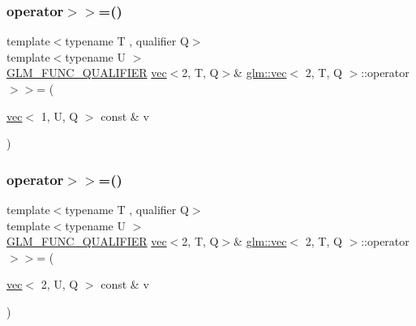 \mbox{\label{structglm_1_1vec_3_012_00_01_t_00_01_q_01_4_a9831eed973635e3d4cea367592355f63}} 
\subsubsection{\texorpdfstring{operator$>$$>$=()}{operator>>=()}\hspace{0.1cm}{\footnotesize\ttfamily [5/6]}}
{\footnotesize\ttfamily template$<$typename T , qualifier Q$>$ \\
template$<$typename U $>$ \\
\hyperlink{setup_8hpp_a33fdea6f91c5f834105f7415e2a64407}{G\+L\+M\+\_\+\+F\+U\+N\+C\+\_\+\+Q\+U\+A\+L\+I\+F\+I\+ER} \hyperlink{structglm_1_1vec}{vec}$<$2, T, Q$>$\& \hyperlink{structglm_1_1vec}{glm\+::vec}$<$ 2, T, Q $>$\+::operator$>$$>$= (\begin{DoxyParamCaption}\item[{\hyperlink{structglm_1_1vec}{vec}$<$ 1, U, Q $>$ const \&}]{v }\end{DoxyParamCaption})}

\mbox{\label{structglm_1_1vec_3_012_00_01_t_00_01_q_01_4_a7ef73d8384eeb47fd2a2afbd897cb06a}} 
\subsubsection{\texorpdfstring{operator$>$$>$=()}{operator>>=()}\hspace{0.1cm}{\footnotesize\ttfamily [6/6]}}
{\footnotesize\ttfamily template$<$typename T , qualifier Q$>$ \\
template$<$typename U $>$ \\
\hyperlink{setup_8hpp_a33fdea6f91c5f834105f7415e2a64407}{G\+L\+M\+\_\+\+F\+U\+N\+C\+\_\+\+Q\+U\+A\+L\+I\+F\+I\+ER} \hyperlink{structglm_1_1vec}{vec}$<$2, T, Q$>$\& \hyperlink{structglm_1_1vec}{glm\+::vec}$<$ 2, T, Q $>$\+::operator$>$$>$= (\begin{DoxyParamCaption}\item[{\hyperlink{structglm_1_1vec}{vec}$<$ 2, U, Q $>$ const \&}]{v }\end{DoxyParamCaption})}

